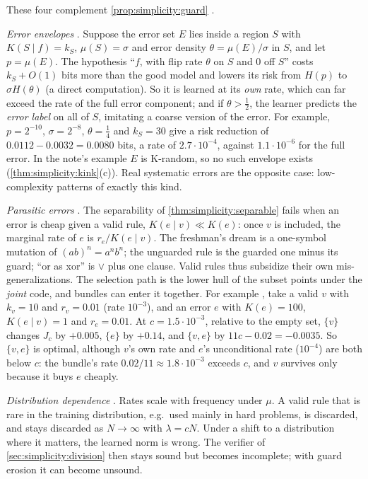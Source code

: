 These four complement \cref{prop:simplicity:guard} .

\emph{Error envelopes} . Suppose the error set $E$ lies inside a region $S$ with $K(S\mid f)=k_S$, $\mu(S)=\sigma$ and error density $\theta=\mu(E)/\sigma$ in $S$, and let $p=\mu(E)$. The hypothesis ``$f$, with flip rate $\theta$ on $S$ and $0$ off $S$'' costs $k_S+O(1)$ bits more than the good model and lowers its risk from $H(p)$ to $\sigma H(\theta)$ (a direct computation). So it is learned at its \emph{own} rate, which can far exceed the rate of the full error component; and if $\theta>\frac12$, the learner predicts the \emph{error label} on all of $S$, imitating a coarse version of the error. For example, $p=2^{-10}$, $\sigma=2^{-8}$, $\theta=\frac14$ and $k_S=30$ give a risk reduction of $0.0112-0.0032=0.0080$ bits, a rate of $2.7\cdot10^{-4}$, against $1.1\cdot10^{-6}$ for the full error. In the note's example $E$ is K-random, so no such envelope exists (\cref{thm:simplicity:kink}(c)). Real systematic errors are the opposite case: low-complexity patterns of exactly this kind.

\emph{Parasitic errors} . The separability of \cref{thm:simplicity:separable} fails when an error is cheap given a valid rule, $K(e\mid v)\ll K(e)$: once $v$ is included, the marginal rate of $e$ is $r_e/K(e\mid v)$. The freshman's dream is a one-symbol mutation of $(ab)^n=a^nb^n$; the unguarded rule is the guarded one minus its guard; ``or as xor'' is $\vee$ plus one clause. Valid rules thus subsidize their own mis-generalizations. The selection path is the lower hull of the subset points under the \emph{joint} code, and bundles can enter it together. For example , take a valid $v$ with $k_v=10$ and $r_v=0.01$ (rate $10^{-3}$), and an error $e$ with $K(e)=100$, $K(e\mid v)=1$ and $r_e=0.01$. At $c=1.5\cdot10^{-3}$, relative to the empty set, $\{v\}$ changes $J_c$ by $+0.005$, $\{e\}$ by $+0.14$, and $\{v,e\}$ by $11c-0.02=-0.0035$. So $\{v,e\}$ is optimal, although $v$'s own rate and $e$'s unconditional rate ($10^{-4}$) are both below $c$: the bundle's rate $0.02/11\approx1.8\cdot10^{-3}$ exceeds $c$, and $v$ survives only because it buys $e$ cheaply.

\emph{Distribution dependence} . Rates scale with frequency under $\mu$. A valid rule that is rare in the training distribution, e.g.\ used mainly in hard problems, is discarded, and stays discarded as $N\to\infty$ with $\lambda=cN$. Under a shift to a distribution where it matters, the learned norm is wrong. The verifier of \cref{sec:simplicity:division} then stays sound but becomes incomplete; with guard erosion it can become unsound.

